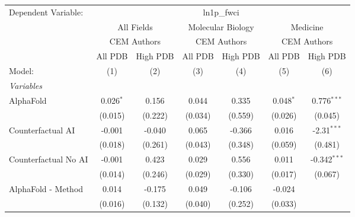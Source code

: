 \begingroup
\centering
\begin{tabular}{lcccccc}
   \tabularnewline \midrule \midrule
   Dependent Variable: & \multicolumn{6}{c}{ln1p\_fwci}\\
 & \multicolumn{2}{c}{All Fields} & \multicolumn{2}{c}{Molecular Biology} & \multicolumn{2}{c}{Medicine} \\
\cmidrule(lr){2-3} \cmidrule(lr){4-5} \cmidrule(lr){6-7}
 & \multicolumn{2}{c}{CEM Authors} & \multicolumn{2}{c}{CEM Authors} & \multicolumn{2}{c}{CEM Authors} \\
\cmidrule(lr){2-3} \cmidrule(lr){4-5} \cmidrule(lr){6-7}
 & \multicolumn{1}{c}{All PDB} & \multicolumn{1}{c}{High PDB} & \multicolumn{1}{c}{All PDB} & \multicolumn{1}{c}{High PDB} & \multicolumn{1}{c}{All PDB} & \multicolumn{1}{c}{High PDB} \\
\cmidrule(lr){2-2} \cmidrule(lr){3-3} \cmidrule(lr){4-4} \cmidrule(lr){5-5} \cmidrule(lr){6-6} \cmidrule(lr){7-7}
   Model:                                                     & (1)          & (2)           & (3)     & (4)     & (5)         & (6)\\  
   \midrule
   \emph{Variables}\\
   AlphaFold                                                  & 0.026$^{*}$  & 0.156         & 0.044   & 0.335   & 0.048$^{*}$ & 0.776$^{***}$\\   
                                                              & (0.015)      & (0.222)       & (0.034) & (0.559) & (0.026)     & (0.045)\\   
   Counterfactual AI                                          & -0.001       & -0.040        & 0.065   & -0.366  & 0.016       & -2.31$^{***}$\\   
                                                              & (0.018)      & (0.261)       & (0.043) & (0.348) & (0.059)     & (0.481)\\   
   Counterfactual No AI                                       & -0.001       & 0.423         & 0.029   & 0.556   & 0.011       & -0.342$^{***}$\\   
                                                              & (0.014)      & (0.246)       & (0.029) & (0.330) & (0.017)     & (0.067)\\   
   AlphaFold - Method                                         & 0.014        & -0.175        & 0.049   & -0.106  & -0.024      &   \\   
                                                              & (0.016)      & (0.132)       & (0.040) & (0.252) & (0.033)     &   \\   

\end{tabular}
